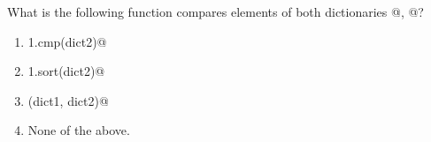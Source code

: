 \question
What is the following function compares elements of both dictionaries @, @?

\begin{enumerate}
\item \lstinline@dict1.cmp(dict2)@
\item \lstinline@dict1.sort(dict2)@
\item \lstinline@cmp(dict1, dict2)@
\item None of the above.
\end{enumerate}

